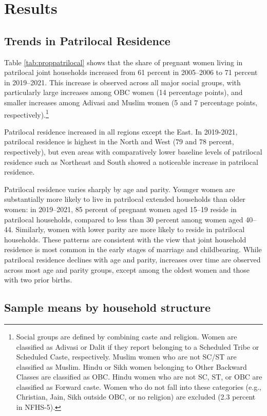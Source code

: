 \documentclass[12pt]{article}
\begin{document}
\section{Results}
\subsection{Trends in Patrilocal Residence}


Table \ref{tab:proppatrilocal} shows that the share of pregnant women living in patrilocal joint households increased from 61 percent in 2005–2006 to 71 percent in 2019–2021. This increase is observed across all major social groups, with particularly large increases among OBC women (14 percentage points), and smaller increases among Adivasi and Muslim women (5 and 7 percentage points, respectively).\footnote{Social groups are defined by combining caste and religion. Women are classified as Adivasi or Dalit if they report belonging to a Scheduled Tribe or Scheduled Caste, respectively. Muslim women who are not SC/ST are classified as Muslim. Hindu or Sikh women belonging to Other Backward Classes are classified as OBC. Hindu women who are not SC, ST, or OBC are classified as Forward caste. Women who do not fall into these categories (e.g., Christian, Jain, Sikh outside OBC, or no religion) are excluded (2.3 percent in NFHS-5).}

Patrilocal residence increased in all regions except the East. In 2019-2021, patrilocal residence is highest in the North and West (79 and 78 percent, respectively), but even areas with comparatively lower baseline levels of patrilocal residence such as Northeast and South showed a noticeable increase in patrilocal residence.  

Patrilocal residence varies sharply by age and parity. Younger women are substantially more likely to live in patrilocal extended households than older women: in 2019–2021, 85 percent of pregnant women aged 15–19 reside in patrilocal households, compared to less than 30 percent among women aged 40–44. Similarly, women with lower parity are more likely to reside in patrilocal households. These patterns are consistent with the view that joint household residence is most common in the early stages of marriage and childbearing. While patrilocal residence declines with age and parity, increases over time are observed across most age and parity groups, except among the oldest women and those with two prior births. 

\subsection{Sample means by household structure}
\end{document}
